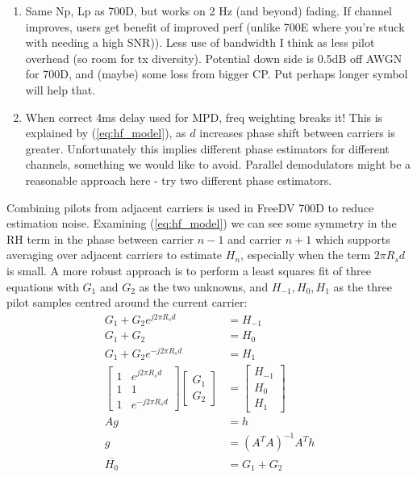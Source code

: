 \documentclass{article}
\begin{document}
\begin{enumerate}
\item Same Np, Lp as 700D, but works on 2 Hz (and beyond) fading.  If channel improves, users get benefit of improved perf (unlike 700E where you're stuck with needing a high SNR)).  Less use of bandwidth I think as less pilot overhead (so room for tx diversity). Potential down side is 0.5dB off AWGN for 700D, and (maybe) some loss from bigger CP.  Put perhaps longer symbol will help that.
\item When correct 4ms delay used for MPD, freq weighting breaks it!  This is explained by (\ref{eq:hf_model}), as $d$ increases phase shift between carriers is greater.  Unfortunately this implies different phase estimators for different channels, something we would like to avoid. Parallel demodulators might be a reasonable approach here - try two different phase estimators.
\end{enumerate}

Combining pilots from adjacent carriers is used in FreeDV 700D to reduce estimation noise.  Examining (\ref{eq:hf_model}) we can see some symmetry in the RH term in the phase between carrier $n-1$ and carrier $n+1$ which supports averaging over adjacent carriers to estimate $H_n$, especially when the term $2 \pi R_s d$ is small.  A more robust approach is to perform a least squares fit of three equations with $G_1$ and $G_2$ as the two unknowns, and $H_{-1}, H_0, H_1$ as the three pilot samples centred around the current carrier:
\begin{equation}
\begin{split}
G_1 + G_2 e^{j 2 \pi R_sd} &= H_{-1} \\
G_1 + G_2 &= H_{0} \\
G_1 + G_2 e^{-j 2 \pi R_sd} &= H_{1} \\
\begin{bmatrix}
  1 & e^{j 2 \pi R_sd} \\
  1 & 1 \\
  1 & e^{-j 2 \pi R_sd}
\end{bmatrix} 
\begin{bmatrix}
  G_1 \\
  G_2
\end{bmatrix} 
&= \begin{bmatrix}
  H_{-1} \\
  H_{0} \\
  H_{1}
\end{bmatrix} \\
Ag &= h \\
 g &= (A^TA)^{-1}A^Th \\
 \overline{H_0} &= G_1 + G_2
\end{split}
\end{equation} 
\end{document}
